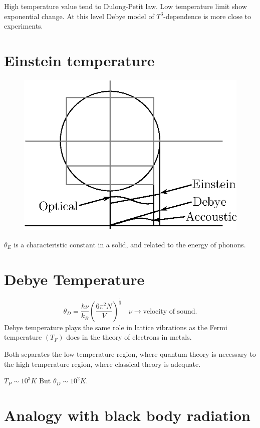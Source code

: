 High temperature value tend to Dulong-Petit law. Low temperature limit show exponential change. At this level Debye model of $T^{3}$-dependence is more close to experiments.

\section*{Einstein temperature\quad {}}
\begin{figure}[H]
\centering
\includegraphics{images/lecture20/fig2.eps}
\end{figure}
$\theta_{E}$ is a characteristic constant in a solid, and related to the energy of phonons.

\section*{Debye Temperature}
$$
\theta_{D}=\dfrac{\hbar \nu}{k_{B}}\left(\dfrac{6\pi^{2}N}{V}\right)^{\frac{1}{3}}\quad \nu\to \text{velocity of sound.}
$$
Debye temperature plays the same role in lattice vibrations as the Fermi temperature $(T_{F})$ does in the theory of electrons in metals.

Both separates the low temperature region, where quantum theory is necessary to the high temperature region, where classical theory is adequate.

$T_{P}\sim 10^{3}K$ But $\theta_{D}\sim 10^{2}K$.

\section*{Analogy with black body radiation}


